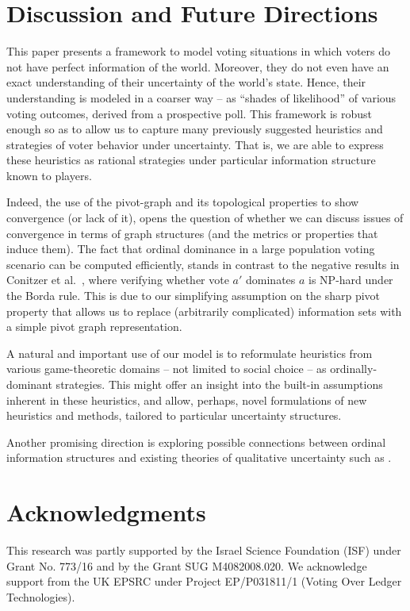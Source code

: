 \documentclass[letterpaper]{article} %
\begin{document}
\section{Discussion and Future Directions}

This paper presents a framework to model voting situations in which voters do not have perfect information of the world. Moreover, they do not even have an exact understanding of their uncertainty of the world's state. Hence, their understanding is modeled in a coarser way -- as ``shades of likelihood'' of various voting outcomes, derived from a prospective poll. This framework is robust enough so as to allow us to capture many previously suggested heuristics and strategies of voter behavior under uncertainty. That is, we are able to express these heuristics as rational strategies under particular information structure known to players.

Indeed, the use of the pivot-graph and its topological properties to show convergence (or lack of it), opens the question of whether we can discuss issues of convergence in terms of graph structures (and the metrics or properties that induce them).
 The fact that ordinal dominance in a large population voting scenario can be computed efficiently, stands in contrast to the negative results in Conitzer et al.~, where verifying whether vote $a'$ dominates $a$ is NP-hard under the Borda rule. This is due to our simplifying assumption on the sharp pivot property that allows us to replace (arbitrarily complicated) information sets with a simple pivot graph representation.

A natural and important use of our model is to reformulate heuristics from various game-theoretic domains -- not limited to social choice -- as ordinally-dominant strategies. This might offer an insight into the built-in assumptions inherent in these heuristics, and allow, perhaps, novel formulations of new heuristics and methods, tailored to particular uncertainty structures.

Another promising direction is exploring possible connections between ordinal information structures and existing theories of qualitative uncertainty such as \cite{Hal97}.

\section*{Acknowledgments}

This research was partly supported by the Israel Science Foundation (ISF) under Grant No. 773/16 and by the Grant SUG  M4082008.020. We acknowledge support from the UK EPSRC under Project EP/P031811/1 (Voting Over Ledger Technologies).
\end{document}
